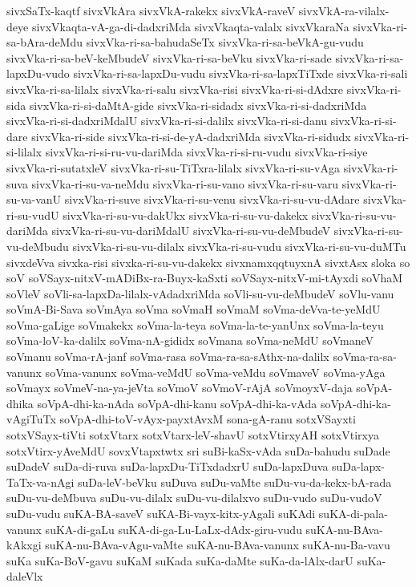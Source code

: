 {sivxSaTx-kaqtf
sivxVkAra
sivxVkA-rakekx
sivxVkA-raveV
sivxVkA-ra-vilalx-deye
sivxVkaqta-vA-ga-di-dadxriMda
sivxVkaqta-valalx
sivxVkaraNa
sivxVka-ri-sa-bAra-deMdu
sivxVka-ri-sa-bahudaSeTx
sivxVka-ri-sa-beVkA-gu-vudu
sivxVka-ri-sa-beV-keMbudeV
sivxVka-ri-sa-beVku
sivxVka-ri-sade
sivxVka-ri-sa-lapxDu-vudo
sivxVka-ri-sa-lapxDu-vudu
sivxVka-ri-sa-lapxTiTxde
sivxVka-ri-sali
sivxVka-ri-sa-lilalx
sivxVka-ri-salu
sivxVka-risi
sivxVka-ri-si-dAdxre
sivxVka-ri-sida
sivxVka-ri-si-daMtA-gide
sivxVka-ri-sidadx
sivxVka-ri-si-dadxriMda
sivxVka-ri-si-dadxriMdalU
sivxVka-ri-si-dalilx
sivxVka-ri-si-danu
sivxVka-ri-si-dare
sivxVka-ri-side
sivxVka-ri-si-de-yA-dadxriMda
sivxVka-ri-sidudx
sivxVka-ri-si-lilalx
sivxVka-ri-si-ru-vu-dariMda
sivxVka-ri-si-ru-vudu
sivxVka-ri-siye
sivxVka-ri-sutatxleV
sivxVka-ri-su-TiTxra-lilalx
sivxVka-ri-su-vAga
sivxVka-ri-suva
sivxVka-ri-su-va-neMdu
sivxVka-ri-su-vano
sivxVka-ri-su-varu
sivxVka-ri-su-va-vanU
sivxVka-ri-suve
sivxVka-ri-su-venu
sivxVka-ri-su-vu-dAdare
sivxVka-ri-su-vudU
sivxVka-ri-su-vu-dakUkx
sivxVka-ri-su-vu-dakekx
sivxVka-ri-su-vu-dariMda
sivxVka-ri-su-vu-dariMdalU
sivxVka-ri-su-vu-deMbudeV
sivxVka-ri-su-vu-deMbudu
sivxVka-ri-su-vu-dilalx
sivxVka-ri-su-vudu
sivxVka-ri-su-vu-duMTu
sivxdeVva
sivxka-risi
sivxka-ri-su-vu-dakekx
sivxnamxqqtuyxnA
sivxtAsx
sloka
so
soV
soVSayx-nitxV-mADiBx-ra-Buyx-kaSxti
soVSayx-nitxV-mi-tAyxdi
soVhaM
soVleV
soVli-sa-lapxDa-lilalx-vAdadxriMda
soVli-su-vu-deMbudeV
soVlu-vanu
soVmA-Bi-Sava
soVmAya
soVma
soVmaH
soVmaM
soVma-deVva-te-yeMdU
soVma-gaLige
soVmakekx
soVma-la-teya
soVma-la-te-yanUnx
soVma-la-teyu
soVma-loV-ka-dalilx
soVma-nA-gididx
soVmana
soVma-neMdU
soVmaneV
soVmanu
soVma-rA-janf
soVma-rasa
soVma-ra-sa-sAthx-na-dalilx
soVma-ra-sa-vanunx
soVma-vanunx
soVma-veMdU
soVma-veMdu
soVmaveV
soVma-yAga
soVmayx
soVmeV-na-ya-jeVta
soVmoV
soVmoV-rAjA
soVmoyxV-daja
soVpA-dhika
soVpA-dhi-ka-nAda
soVpA-dhi-kanu
soVpA-dhi-ka-vAda
soVpA-dhi-ka-vAgiTuTx
soVpA-dhi-toV-vAyx-payxtAvxM
sona-gA-ranu
sotxVSayxti
sotxVSayx-tiVti
sotxVtarx
sotxVtarx-leV-shavU
sotxVtirxyAH
sotxVtirxya
sotxVtirx-yAveMdU
sovxVtapxtwtx
sri
suBi-kaSx-vAda
suDa-bahudu
suDade
suDadeV
suDa-di-ruva
suDa-lapxDu-TiTxdadxrU
suDa-lapxDuva
suDa-lapx-TaTx-va-nAgi
suDa-leV-beVku
suDuva
suDu-vaMte
suDu-vu-da-kekx-bA-rada
suDu-vu-deMbuva
suDu-vu-dilalx
suDu-vu-dilalxvo
suDu-vudo
suDu-vudoV
suDu-vudu
suKA-BA-saveV
suKA-Bi-vayx-kitx-yAgali
suKAdi
suKA-di-pala-vanunx
suKA-di-gaLu
suKA-di-ga-Lu-LaLx-dAdx-giru-vudu
suKA-nu-BAva-kAkxgi
suKA-nu-BAva-vAgu-vaMte
suKA-nu-BAva-vanunx
suKA-nu-Ba-vavu
suKa
suKa-BoV-gavu
suKaM
suKada
suKa-daMte
suKa-da-lAlx-darU
suKa-daleVlx
}
